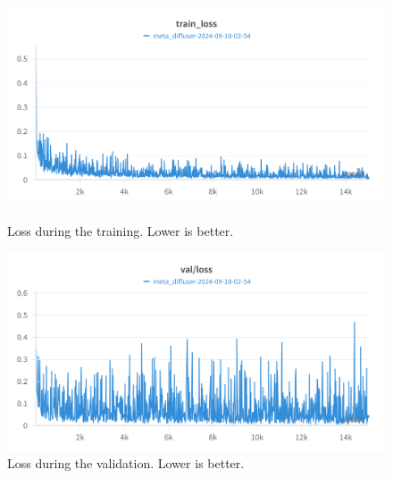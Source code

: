 
\begin{figure}[H]
\includegraphics[width=\linewidth]{detailed_engineering/Meta Diffusion/charts/train_loss.png}
\caption{Loss during the training. Lower is better.}
\endminipage\hfill
{}
\includegraphics[width=\linewidth]{detailed_engineering/Meta Diffusion/charts/val_loss.png}
\caption{Loss during the validation. Lower is better.}
\endminipage
\end{figure}

